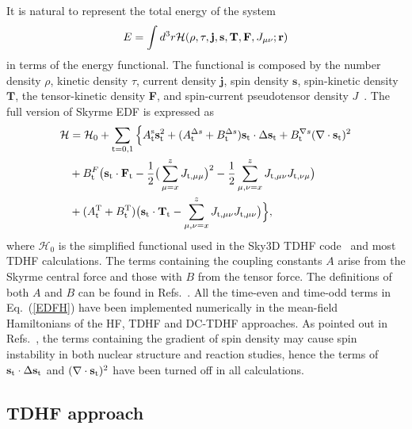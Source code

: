 \documentclass[aps,prc,twocolumn,showpacs,superscriptaddress,longbibliography,nofootinbib,floatfix,10pt]{revtex4-1}
\begin{document}
It is natural to represent the total energy of the system
\begin{equation}
E=\int d^3r  {\cal H}(\rho, \tau, {\mathbf{j}}, {\textbf{s}}, {\textbf{T}}, {\textbf{F}}, J_{\mu\nu}; {\mathbf{r}})
\label{Energy}
\end{equation}
in terms of the energy functional. The functional is composed by
the number density $\rho$, kinetic density $\tau$, current density ${\mathbf{j}}$, spin density ${\mathbf{s}}$, spin-kinetic density ${\mathbf{T}}$,
the tensor-kinetic density {\textbf{F}}, and spin-current pseudotensor density $J$~\cite{Stevenson2016_PRC93-054617}. The full version of Skyrme EDF is expressed as
\begin{align}
\label{EDFH}
\begin{split}
\mathcal{H}&=\mathcal{H}_0+\sum_{\rm{t=0,1}}\Big\{A_{\rm{t}}^{\rm{s}}\mathbf{s}_{\rm{t}}^2+(A_{\rm{t}}^{\Delta{s}}+B_{\rm{t}}^{\Delta{s}})
\mathbf{s}_{\rm{t}}\cdot\Delta\mathbf{s}_{\rm{t}}+B_{\rm{t}}^{\nabla s}(\nabla\cdot \mathbf{s}_{\rm{t}})^2 \\
&+B_{\rm{t}}^{F}\big(\mathbf{s}_{\rm{t}}\cdot
\mathbf {F}_{\rm{t}}-\frac{1}{2}\big(\sum_{\mu=x}^{z}J_{\rm{t}, \mu\mu}\big)^2-\frac{1}{2}\sum_{\mu, \nu=x}^{z}J_{\rm{t}, \mu\nu}J_{\rm{t}, \nu \mu}\big)\\
&+(A_{\rm{t}}^{\rm{T}}+B_{\rm{t}}^{\rm{T}})\big(\mathbf{s}_{\rm{t}}\cdot\mathbf{T}_{\rm{t}}-
\sum_{\mu,\nu=x}^{z}J_{\rm{t},\mu\nu}J_{\rm{t},\mu\nu}\big)\Big\},
\end{split}
\end{align}
where $\mathcal{H}_0$ is the simplified functional used in the Sky3D TDHF code~\cite{Maruhn2014_CPC185-2195} and most TDHF calculations.
The terms containing the coupling constants $A$ arise from the Skyrme central force and those with $B$ from the tensor force. The definitions of both $A$ and $B$
can be found in Refs.~\cite{Lesinski2007_PRC76-014312,Davesne2009_PRC80-024314}. All the time-even and time-odd terms in Eq.~(\ref{EDFH}) have been implemented numerically in the mean-field Hamiltonians of the HF, TDHF and
DC-TDHF approaches.
As pointed out in Refs.~\cite{Lesinski2007_PRC76-014312,Stevenson2016_PRC93-054617}, the terms containing the gradient of spin density may cause spin instability in both nuclear structure and reaction studies, hence the terms of $\mathbf{s}_{\rm{t}}\cdot\Delta\mathbf{s}_{\rm{t}}$ and $(\nabla\cdot \mathbf{s}_{\rm{t}})^2$ have been turned off in all calculations.

\subsection{TDHF approach}
\end{document}
